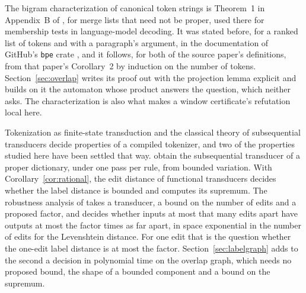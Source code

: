\documentclass[11pt,a4paper]{article}
\theoremstyle{definition}
\theoremstyle{plain}
\newcommand{\code}[1]{\texttt{#1}}
\begin{document}
The bigram characterization of canonical token strings is Theorem~1 in Appendix~B of \citet{vieira2025canonical}, for
merge lists that need not be proper, used there for membership tests in language-model decoding. It was stated before,
for a ranked list of tokens and with a paragraph's argument, in the documentation of GitHub's \code{bpe} crate
\citep{vanantwerpen2024bpe}, and it follows, for both of the source paper's definitions, from that paper's Corollary~2
by induction on the number of tokens. Section~\ref{sec:overlap} writes its proof out with the projection lemma explicit
and builds on it the automaton whose product answers the question, which neither asks. The characterization is also what
makes a window certificate's refutation local here.

Tokenization as finite-state transduction \citep{cognetta2025transduction} and the classical theory of subsequential
transducers \citep{mohri1997transducers} decide properties of a compiled tokenizer, and two of the properties studied
here have been settled that way. \citet[Theorem~4]{berglund2024dfa} obtain the subsequential transducer of a proper
dictionary, under one pass per rule, from bounded variation. With Corollary~\ref{cor:rational}, the edit distance of
functional transducers \citep[Theorem~3.25 and Corollary~3.12]{aiswarya2024edit} decides whether the label distance is
bounded and computes its supremum. The robustness analysis of \citet[Definition~2.1 and
Theorem~4.4]{samanta2013robustness} takes a transducer, a bound on the number of edits and a proposed factor, and
decides whether inputs at most that many edits apart have outputs at most the factor times as far apart, in space
exponential in the number of edits for the Levenshtein distance. For one edit that is the question whether the one-edit
label distance is at most the factor. Section~\ref{sec:labelgraph} adds to the second a decision in polynomial time on
the overlap graph, which needs no proposed bound, the shape of a bounded component and a bound on the supremum.
\end{document}

